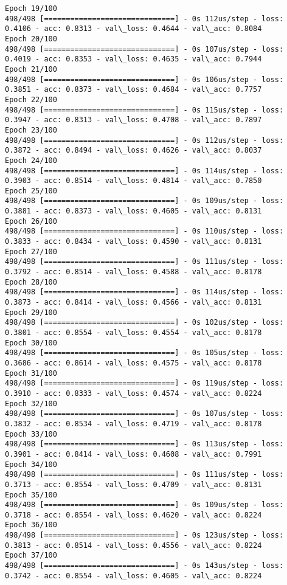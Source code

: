 \documentclass[11pt]{article}
\begin{document}
\begin{Verbatim}[commandchars=\\\{\}]
Epoch 19/100
498/498 [==============================] - 0s 112us/step - loss: 0.4106 - acc: 0.8313 - val\_loss: 0.4644 - val\_acc: 0.8084
Epoch 20/100
498/498 [==============================] - 0s 107us/step - loss: 0.4019 - acc: 0.8353 - val\_loss: 0.4635 - val\_acc: 0.7944
Epoch 21/100
498/498 [==============================] - 0s 106us/step - loss: 0.3851 - acc: 0.8373 - val\_loss: 0.4684 - val\_acc: 0.7757
Epoch 22/100
498/498 [==============================] - 0s 115us/step - loss: 0.3947 - acc: 0.8313 - val\_loss: 0.4708 - val\_acc: 0.7897
Epoch 23/100
498/498 [==============================] - 0s 112us/step - loss: 0.3872 - acc: 0.8494 - val\_loss: 0.4626 - val\_acc: 0.8037
Epoch 24/100
498/498 [==============================] - 0s 114us/step - loss: 0.3903 - acc: 0.8514 - val\_loss: 0.4814 - val\_acc: 0.7850
Epoch 25/100
498/498 [==============================] - 0s 109us/step - loss: 0.3881 - acc: 0.8373 - val\_loss: 0.4605 - val\_acc: 0.8131
Epoch 26/100
498/498 [==============================] - 0s 110us/step - loss: 0.3833 - acc: 0.8434 - val\_loss: 0.4590 - val\_acc: 0.8131
Epoch 27/100
498/498 [==============================] - 0s 111us/step - loss: 0.3792 - acc: 0.8514 - val\_loss: 0.4588 - val\_acc: 0.8178
Epoch 28/100
498/498 [==============================] - 0s 114us/step - loss: 0.3873 - acc: 0.8414 - val\_loss: 0.4566 - val\_acc: 0.8131
Epoch 29/100
498/498 [==============================] - 0s 102us/step - loss: 0.3801 - acc: 0.8554 - val\_loss: 0.4554 - val\_acc: 0.8178
Epoch 30/100
498/498 [==============================] - 0s 105us/step - loss: 0.3686 - acc: 0.8614 - val\_loss: 0.4575 - val\_acc: 0.8178
Epoch 31/100
498/498 [==============================] - 0s 119us/step - loss: 0.3910 - acc: 0.8333 - val\_loss: 0.4574 - val\_acc: 0.8224
Epoch 32/100
498/498 [==============================] - 0s 107us/step - loss: 0.3832 - acc: 0.8534 - val\_loss: 0.4719 - val\_acc: 0.8178
Epoch 33/100
498/498 [==============================] - 0s 113us/step - loss: 0.3901 - acc: 0.8414 - val\_loss: 0.4608 - val\_acc: 0.7991
Epoch 34/100
498/498 [==============================] - 0s 111us/step - loss: 0.3713 - acc: 0.8554 - val\_loss: 0.4709 - val\_acc: 0.8131
Epoch 35/100
498/498 [==============================] - 0s 109us/step - loss: 0.3718 - acc: 0.8554 - val\_loss: 0.4620 - val\_acc: 0.8224
Epoch 36/100
498/498 [==============================] - 0s 123us/step - loss: 0.3813 - acc: 0.8514 - val\_loss: 0.4556 - val\_acc: 0.8224
Epoch 37/100
498/498 [==============================] - 0s 143us/step - loss: 0.3742 - acc: 0.8554 - val\_loss: 0.4605 - val\_acc: 0.8224

\end{Verbatim}
\end{document}
